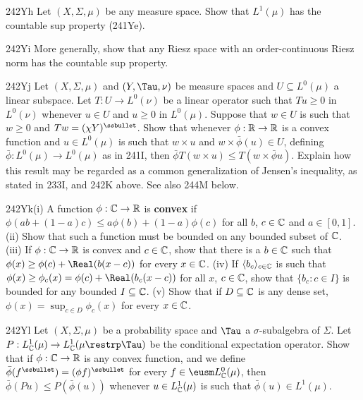 {\spheader 242Yh Let $(X,\Sigma,\mu)$ be any measure space.
Show that $L^1(\mu)$ has the countable sup property (241Ye).

\spheader 242Yi More generally, show that any Riesz space
with an order-continuous Riesz norm has the countable sup property.

\spheader 242Yj Let $(X,\Sigma,\mu)$ and $(Y,\Tau,\nu)$ be measure
spaces and $U\subseteq L^0(\mu)$ a linear subspace.   Let
$T:U\to L^0(\nu)$ be a linear operator such that $Tu\ge 0$ in
$L^0(\nu)$
whenever $u\in U$ and $u\ge 0$ in $L^0(\mu)$.   Suppose that $w\in U$ is
such that $w\ge 0$ and $Tw=(\chi Y)^{\ssbullet}$.   Show that whenever
$\phi:\Bbb R\to\Bbb R$ is a convex function and $u\in L^0(\mu)$ is
such that $w\times u$ and $w\times\bar\phi(u)\in U$, defining
$\bar\phi:L^0(\mu)\to L^0(\mu)$ as in 241I, then
$\bar\phi T(w\times u)\le T(w\times\bar\phi u)$.   Explain how this
result may be regarded
as a common generalization of Jensen's inequality, as stated in 233I,
and 242K above.   See also 244M below.

\spheader 242Yk(i) A function $\phi:\Bbb C\to\Bbb R$ is {\bf convex}
if
$\phi(ab+(1-a)c)\le a\phi(b)+(1-a)\phi(c)$ for all $b$, $c\in\Bbb C$
and
$a\in [0,1]$.   (ii) Show that such a function must be bounded on any
bounded subset of $\Bbb C$.   (iii) If $\phi:\Bbb C\to\Bbb R$ is
convex
and $c\in\Bbb C$, show that there is a $b\in\Bbb C$ such that
$\phi(x)\ge\phi(c)+\Real(b(x-c))$ for every $x\in\Bbb C$.   (iv) If
$\langle b_c\rangle_{c\in\Bbb C}$ is such that
$\phi(x)\ge\phi_c(x)=\phi(c)+\Real(b_c(x-c))$ for all $x$, $c\in\Bbb
C$,
show that $\{b_c:c\in I\}$ is bounded for any bounded
$I\subseteq\Bbb C$.
(v) Show that if $D\subseteq\Bbb C$ is any dense set,
$\phi(x)=\sup_{c\in D}\phi_c(x)$ for every $x\in\Bbb C$.

\spheader 242Yl Let $(X,\Sigma,\mu)$ be a probability space and
$\Tau$ a
$\sigma$-subalgebra of $\Sigma$.   Let
$P:L^1_{\Bbb C}(\mu)\to L^1_{\Bbb C}(\mu\restrp\Tau)$ be the
conditional
expectation operator.   Show that
if $\phi:\Bbb C\to\Bbb R$ is any convex function, and we define
$\bar\phi(f^{\ssbullet})=(\phi f)^{\ssbullet}$ for every
$f\in\eusm L^0_{\Bbb C}(\mu)$, then $\bar\phi(Pu)\le P(\bar\phi(u))$
whenever $u\in L^1_{\Bbb C}(\mu)$ is such that
$\bar\phi(u)\in L^1(\mu)$.
}%

